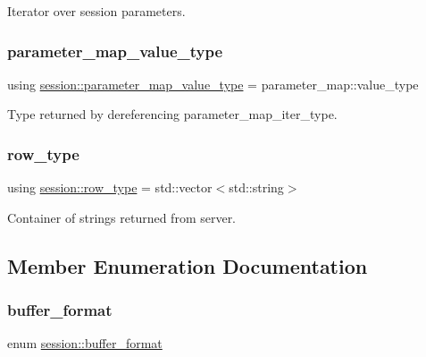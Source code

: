 Iterator over session parameters. 

\mbox{\label{classsession_aedf4b50ee29f6febfcc14df2d360ef98}} 
\subsubsection{\texorpdfstring{parameter\+\_\+map\+\_\+value\+\_\+type}{parameter\_map\_value\_type}}
{\footnotesize\ttfamily using \hyperlink{classsession_aedf4b50ee29f6febfcc14df2d360ef98}{session\+::parameter\+\_\+map\+\_\+value\+\_\+type} =  parameter\+\_\+map\+::value\+\_\+type}



Type returned by dereferencing parameter\+\_\+map\+\_\+iter\+\_\+type. 

\mbox{\label{classsession_ae75ba42ea21ef0fabffb963ca7e36380}} 
\subsubsection{\texorpdfstring{row\+\_\+type}{row\_type}}
{\footnotesize\ttfamily using \hyperlink{classsession_ae75ba42ea21ef0fabffb963ca7e36380}{session\+::row\+\_\+type} =  std\+::vector$<$std\+::string$>$}



Container of strings returned from server. 



\subsection{Member Enumeration Documentation}
\mbox{\label{classsession_a960cb940bd12cd63c142c1ffae816b24}} 
\subsubsection{\texorpdfstring{buffer\+\_\+format}{buffer\_format}}
{\footnotesize\ttfamily enum \hyperlink{classsession_a960cb940bd12cd63c142c1ffae816b24}{session\+::buffer\+\_\+format}\hspace{0.3cm}{\ttfamily [strong]}}



